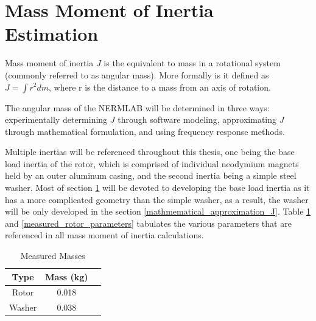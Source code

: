 \newpage
\section{Mass Moment of Inertia Estimation}
\label{mass_moment_of_inertia_estimation}
Mass moment of inertia \(J\) is the equivalent to mass in a rotational system (commonly referred to as angular mass). More formally is it defined as \(J = \int r^2 dm\), where r is the distance to a mass from an axis of rotation.

The angular mass of the NERMLAB will be determined in three ways: experimentally determining \(J\) through software modeling, approximating \(J\) through mathematical formulation, and using frequency response methods. 

Multiple inertias will be referenced throughout this thesis, one being the base load inertia of the rotor, which is comprised of individual neodymium magnets held by an outer aluminum casing, and the second inertia being a simple steel washer. Most of section \ref{mass_moment_of_inertia_estimation} will be devoted to developing the base load inertia as it has a more complicated geometry than the simple washer, as a result, the washer will be only developed in the section \ref{mathmematical_approximation_J}. Table \ref{measured_masses} and \ref{measured_rotor_parameters} tabulates the various parameters that are referenced in all mass moment of inertia calculations.

\begin{table}[ht]
	\begin{center}
		\caption[Measured Masses]{Measured Masses}
		\begin{tabular}[c]{|c|c|c|}
			
			\hline
			\textbf{Type} & \textbf{Mass (kg)}\\
			
			\hline
			Rotor & 0.018 \\
			
			\hline
			Washer & 0.038 \\
			
			\hline
		\end{tabular}
		
		\label{measured_masses}
	\end{center}
\end{table}

